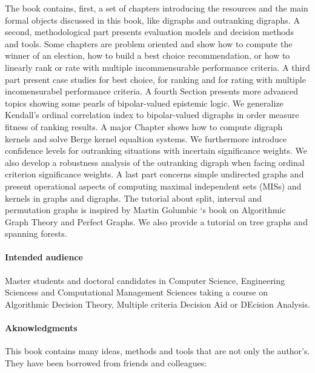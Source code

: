 \noindent The book contains, first, a set of chapters introducing the \Digraph resources and the main formal objects discussed in this book, like digraphs and outranking digraphs. A second, methodological part presents evaluation models and decision methods and tools. Some chapters are problem oriented and show how to compute the winner of an election, how to build a best choice recommendation, or how to linearly rank or rate with multiple incommensurable performance criteria. A third part present case studies for best choice, for ranking and for rating with multiple incomensurabel performance criteria. A fourth Section presents more advanced topics showing some pearls of bipolar-valued epistemic logic. We generalize Kendall's ordinal correlation index to bipolar-valued digraphs in order measure fitness of ranking results. A major Chapter shows how to compute digraph kernels and solve Berge kernel equaltion systems. We furthermore introduce confidence levels for outranking situations with incertain significance weights. We also develop a robustness analysis of the outranking digraph when facing ordinal criterion significance weights. A last part concerns simple undirected graphs and present operational aspects of computing maximal independent sets (MISs) and kernels in graphs and digraphs. The tutorial about split, interval and permutation graphs is inspired by Martin Golumbic ‘s book on Algorithmic Graph Theory and Perfect Graphs. We also provide a tutorial on tree graphs and spanning forests.

\paragraph{Intended audience}

Master students and doctoral candidates in Computer Science, Engineering Sciencess and Computational Management Sciences taking a course on Algorithmic Decision Theory, Multiple criteria Decision Aid or DEcision Analysis.

\paragraph{Aknowledgments}

This book contains many ideas, methods and tools that are not only the author’s. They have been borrowed from friends and colleagues: 

